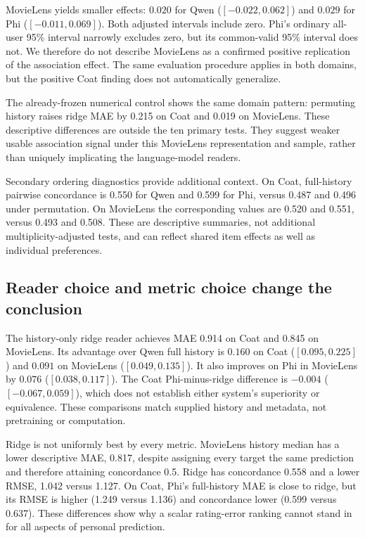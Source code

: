 MovieLens yields smaller effects: $0.020$ for Qwen ($[-0.022,0.062]$) and $0.029$ for Phi ($[-0.011,0.069]$). Both adjusted intervals include zero. Phi's ordinary all-user 95\% interval narrowly excludes zero, but its common-valid 95\% interval does not. We therefore do not describe MovieLens as a confirmed positive replication of the association effect. The same evaluation procedure applies in both domains, but the positive Coat finding does not automatically generalize.

The already-frozen numerical control shows the same domain pattern: permuting history raises ridge MAE by 0.215 on Coat and 0.019 on MovieLens. These descriptive differences are outside the ten primary tests. They suggest weaker usable association signal under this MovieLens representation and sample, rather than uniquely implicating the language-model readers.

Secondary ordering diagnostics provide additional context. On Coat, full-history pairwise concordance is 0.550 for Qwen and 0.599 for Phi, versus 0.487 and 0.496 under permutation. On MovieLens the corresponding values are 0.520 and 0.551, versus 0.493 and 0.508. These are descriptive summaries, not additional multiplicity-adjusted tests, and can reflect shared item effects as well as individual preferences.

\subsection{Reader choice and metric choice change the conclusion}
The history-only ridge reader achieves MAE 0.914 on Coat and 0.845 on MovieLens. Its advantage over Qwen full history is $0.160$ on Coat ($[0.095,0.225]$) and $0.091$ on MovieLens ($[0.049,0.135]$). It also improves on Phi in MovieLens by $0.076$ ($[0.038,0.117]$). The Coat Phi-minus-ridge difference is $-0.004$ ($[-0.067,0.059]$), which does not establish either system's superiority or equivalence. These comparisons match supplied history and metadata, not pretraining or computation.

Ridge is not uniformly best by every metric. MovieLens history median has a lower descriptive MAE, 0.817, despite assigning every target the same prediction and therefore attaining concordance 0.5. Ridge has concordance 0.558 and a lower RMSE, 1.042 versus 1.127. On Coat, Phi's full-history MAE is close to ridge, but its RMSE is higher (1.249 versus 1.136) and concordance lower (0.599 versus 0.637). These differences show why a scalar rating-error ranking cannot stand in for all aspects of personal prediction.

